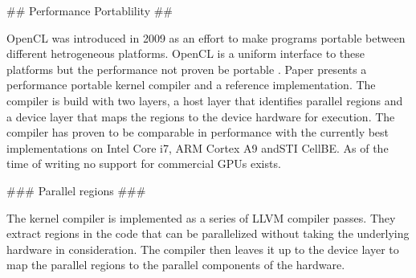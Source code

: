 \begin{markdown}

## Performance Portablility ##

OpenCL \cite{opencl} was introduced in 2009 as an effort to make
programs portable between different hetrogeneous platforms. OpenCL is
a uniform interface to these platforms but the performance not proven
be portable \cite{komatsu2010evaluating}. Paper \cite{pocl} presents a
performance portable kernel compiler and a reference
implementation. The compiler is build with two layers, a host layer
that identifies parallel regions and a device layer that maps the
regions to the device hardware for execution. The compiler has proven
to be comparable in performance with the currently best
implementations on Intel Core i7, ARM Cortex A9 andSTI CellBE.
As of the time of writing no support for commercial GPUs exists.

### Parallel regions ###

The kernel compiler is implemented as a series of LLVM compiler
passes. They extract regions in the code that can be parallelized
without taking the underlying hardware in consideration. The compiler
then leaves it up to the device layer to map the parallel regions to
the parallel components of the hardware. 

\end{markdown}
